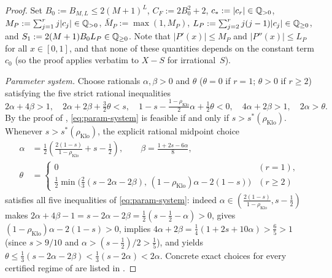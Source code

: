\documentclass[11pt]{article}
\newcommand{\rhoK}{\rho_{\mathrm{Klo}}}
\begin{document}
\begin{proof}
Set $B_0:=B_{M,L}\le 2(M+1)^L$, $C_F:=2B_0^2+2$, $c_*:=|c_r|\in\mathbb Q_{>0}$, $M_P:=\sum_{j=1}^r j|c_j|\in\mathbb Q_{>0}$, $\bar M_P:=\max(1,M_P)$, $L_P:=\sum_{j=2}^r j(j-1)|c_j|\in\mathbb Q_{\ge0}$, and $S_1:=2(M+1)B_0L_P\in\mathbb Q_{\ge0}$. Note that $|P'(x)|\le M_P$ and $|P''(x)|\le L_P$ for all $x\in[0,1]$, and that none of these quantities depends on the constant term $c_0$ (so the proof applies verbatim to $X-S$ for irrational~$S$).

\emph{Parameter system.} Choose rationals $\alpha,\beta>0$ and $\theta$ ($\theta=0$ if $r=1$; $\theta>0$ if $r\ge2$) satisfying the five strict rational inequalities
\begin{equation}\label{eq:param-system}
2\alpha+4\beta>1,\quad
2\alpha+2\beta+\tfrac32\theta<s,\quad
1-s-\tfrac{1-\rhoK}{2}\alpha+\tfrac12\theta<0,\quad
4\alpha+2\beta>1,\quad
2\alpha>\theta.
\end{equation}
By the proof of , \eqref{eq:param-system} is feasible if and only if $s>s^*(\rhoK)$. Whenever $s>s^*(\rhoK)$, the explicit rational midpoint choice
\begin{equation}\label{eq:midpoint}
\begin{aligned}
\alpha&=\frac12\!\left(\frac{2(1-s)}{1-\rhoK}+s-\frac12\right),\qquad
\beta=\frac{1+2s-6\alpha}{8},\\
\theta&=\begin{cases}
0 & (r=1),\\
\frac12\min\!\bigl(\frac23(s-2\alpha-2\beta),\,(1-\rhoK)\alpha-2(1-s)\bigr) & (r\ge2)
\end{cases}
\end{aligned}
\end{equation}
satisfies all five inequalities of \eqref{eq:param-system}: indeed $\alpha\in(\frac{2(1-s)}{1-\rhoK},s-\frac12)$ makes $2\alpha+4\beta-1=s-2\alpha-2\beta=\frac12(s-\frac12-\alpha)>0$, gives $(1-\rhoK)\alpha-2(1-s)>0$, implies $4\alpha+2\beta=\frac14(1+2s+10\alpha)>\frac65>1$ (since $s>9/10$ and $\alpha>(s-\frac12)/2>\frac15$), and yields $\theta\le\frac13(s-2\alpha-2\beta)<\frac13(s-2\alpha)<2\alpha$. Concrete exact choices for every certified regime of  are listed in .


\end{proof}
\end{document}
